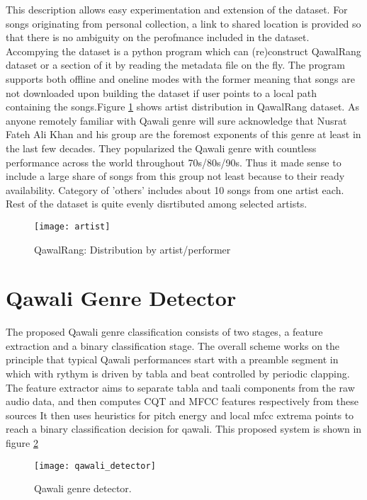 \documentclass{article}
\begin{document}
This description allows easy experimentation and extension of the dataset. For songs originating from personal collection, a link to shared location is provided so that there is no ambiguity on the perofmance included in the dataset. Accompying the dataset is a python program which can (re)construct QawalRang dataset or a section of it by reading the metadata file on the fly. The program supports both offline and oneline modes with the former meaning that songs are not downloaded upon building the dataset if user points to a local path containing the songs.Figure \ref{fig:author_dist} shows artist distribution in QawalRang dataset. As anyone remotely familiar with Qawali genre will sure acknowledge that Nusrat Fateh Ali Khan and his group are the foremost exponents of this genre at least in the last few decades. They popularized the Qawali genre with countless performance across the world throughout 70s/80s/90s. Thus it made sense to include a large share of songs from this group not least because to their ready availability. Category of 'others' includes about 10 songs from one artist each. Rest of the dataset is quite evenly disrtibuted among selected artists.

\begin{figure}[htbp]
  \centering
  \texttt{[image: artist]}
  \caption{QawalRang: Distribution by artist/performer}
\label{fig:author_dist}
\end{figure}

\section{Qawali Genre Detector}\label{sec:detector}

The proposed Qawali genre classification consists of two stages, a feature extraction and a binary classification stage. The overall scheme works on the principle that typical Qawali performances start with a preamble segment in which with rythym is driven by tabla and beat controlled by periodic clapping. The feature extractor aims to separate tabla and taali components from the raw audio data, and then computes CQT and MFCC features respectively from these sources It then uses heuristics for pitch energy and local mfcc extrema points to reach a binary classification decision for qawali. This proposed system is shown in figure \ref{fig:figure}
\begin{figure}[htbp]
  \centering
  \texttt{[image: qawali\_detector]}
  \caption{Qawali genre detector.}
\label{fig:figure}
\end{figure}
\end{document}

